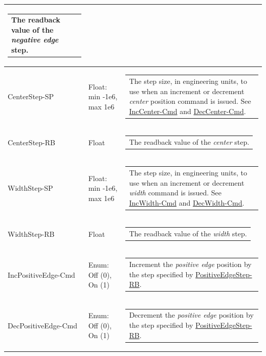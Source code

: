 \documentclass[openany]{article}
\begin{document}
\begin{longtable}{| m{4.5cm} m{2.5cm}  m{7.0cm} |}
\begin{tabular}{@{}m{6cm}@{}}
                The readback value of the \emph{negative edge} step.
            \end{tabular} \hypertarget{pv:center-step}{}\\ \hline
        CenterStep-SP & Float: min -1e6, max 1e6 & \begin{tabular}{@{}m{6cm}@{}}
                The step size, in engineering units, to use when an increment or decrement \emph{center} position command is issued. See \hyperlink{pv:inc-center-cmd}{IncCenter-Cmd} and \hyperlink{pv:dec-center-cmd}{DecCenter-Cmd}.
            \end{tabular} \hypertarget{}{}\\ \hline
        CenterStep-RB & Float & \begin{tabular}{@{}m{6cm}@{}}
                The readback value of the \emph{center} step.
            \end{tabular} \hypertarget{pv:width-step}{}\\ \hline
        WidthStep-SP & Float: min -1e6, max 1e6 & \begin{tabular}{@{}m{6cm}@{}}
                The step size, in engineering units, to use when an increment or decrement \emph{width} command is issued. See \hyperlink{pv:inc-width-cmd}{IncWidth-Cmd} and \hyperlink{pv:dec-width-cmd}{DecWidth-Cmd}.
            \end{tabular} \hypertarget{}{}\\ \hline
        WidthStep-RB & Float & \begin{tabular}{@{}m{6cm}@{}}
                The readback value of the \emph{width} step.
            \end{tabular} \hypertarget{pv:inc-positive-edge-cmd}{}\\ \hline
        IncPositiveEdge-Cmd & Enum: Off (0), On (1) & \begin{tabular}{@{}m{6cm}@{}}
                Increment the \emph{positive edge} position by the step specified by \hyperlink{pv:positive-edge-step}{PositiveEdgeStep-RB}.
            \end{tabular} \hypertarget{pv:dec-positive-edge-cmd}{}\\ \hline
        DecPositiveEdge-Cmd & Enum: Off (0), On (1) & \begin{tabular}{@{}m{6cm}@{}}
                Decrement the \emph{positive edge} position by the step specified by \hyperlink{pv:positive-edge-step}{PositiveEdgeStep-RB}.

\end{tabular}
\end{longtable}
\end{document}

